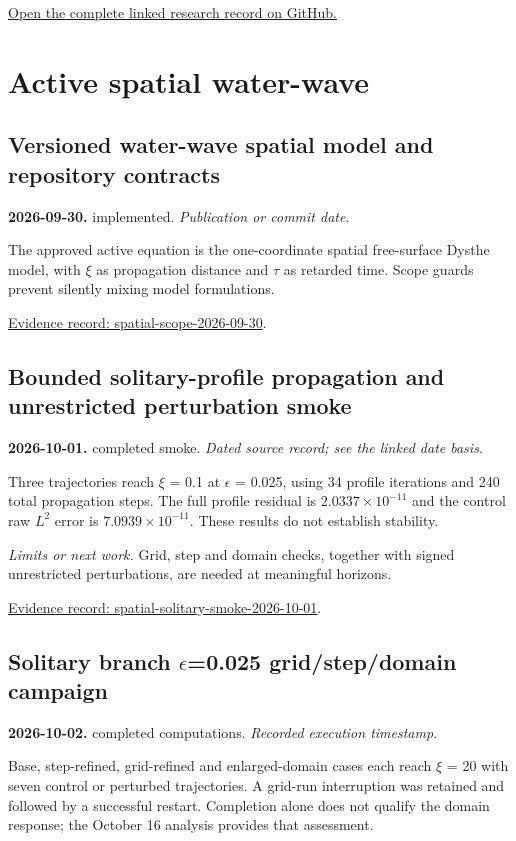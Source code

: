 \documentclass[11pt]{article}
\begin{document}
\noindent\href{https://github.com/matasvai/dysthe-research-map/tree/codex/research-record-2026-11-05/research-record/2026-11-05}{Open the complete linked research record on GitHub.}

\section{Active spatial water-wave}
\subsection*{Versioned water-wave spatial model and repository contracts}
\noindent\textbf{2026-09-30.} implemented. \emph{Publication or commit date}.\par
The approved active equation is the one-coordinate spatial free-surface Dysthe model, with $\xi$ as propagation distance and $\tau$ as retarded time. Scope guards prevent silently mixing model formulations.

\noindent\href{https://github.com/matasvai/dysthe-paper/blob/codex/research-record-2026-11-05/research-record/2026-11-05/README.md#spatial-scope-2026-09-30}{Evidence record: spatial-scope-2026-09-30}.
\subsection*{Bounded solitary-profile propagation and unrestricted perturbation smoke}
\noindent\textbf{2026-10-01.} completed smoke. \emph{Dated source record; see the linked date basis}.\par
Three trajectories reach $\xi$ = 0.1 at $\epsilon$ = 0.025, using 34 profile iterations and 240 total propagation steps. The full profile residual is $2.0337\times 10^{-11}$ and the control raw $L^2$ error is $7.0939\times 10^{-11}$. These results do not establish stability.

\noindent\textit{Limits or next work.} Grid, step and domain checks, together with signed unrestricted perturbations, are needed at meaningful horizons.

\noindent\href{https://github.com/matasvai/dysthe-paper/blob/codex/research-record-2026-11-05/research-record/2026-11-05/README.md#spatial-solitary-smoke-2026-10-01}{Evidence record: spatial-solitary-smoke-2026-10-01}.
\subsection*{Solitary branch $\epsilon$=0.025 grid/step/domain campaign}
\noindent\textbf{2026-10-02.} completed computations. \emph{Recorded execution timestamp}.\par
Base, step-refined, grid-refined and enlarged-domain cases each reach $\xi$ = 20 with seven control or perturbed trajectories. A grid-run interruption was retained and followed by a successful restart. Completion alone does not qualify the domain response; the October 16 analysis provides that assessment.
\end{document}
